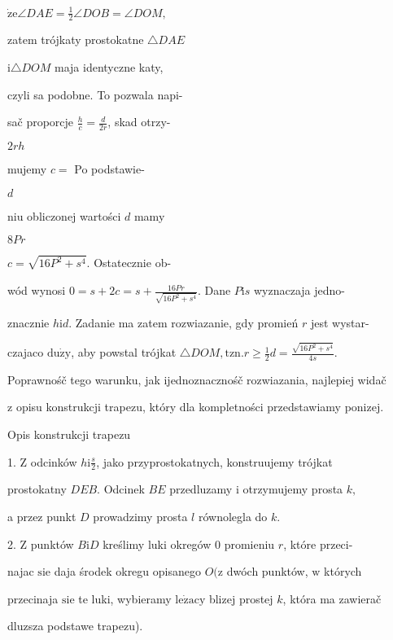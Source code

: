 \documentclass[a4paper,12pt]{article}
\begin{document}
$\dot{\mathrm{z}}\mathrm{e} \angle DAE = \displaystyle \frac{1}{2}\angle DOB = \angle DOM,$

zatem trójkaty prostokatne $\triangle DAE$

$\mathrm{i} \triangle DOM$ maja identyczne katy,

czyli sa podobne. To pozwala napi-

sač proporcje $\displaystyle \frac{h}{c}= \displaystyle \frac{d}{2r}$, skad otrzy-

$2rh$

mujemy $c =$ Po podstawie-

$d$

niu obliczonej wartości $d$ mamy

$8Pr$

$c= \sqrt{16P^{2}+s^{4}}$. Ostatecznie ob-

wód wynosi $0=s+2c=s+\displaystyle \frac{16Pr}{\sqrt{16P^{2}+s^{4}}}$. Dane $P\mathrm{i}s$ wyznaczaja jedno-

znacznie $h\mathrm{i}d$. Zadanie ma zatem rozwiazanie, gdy promień $r$ jest wystar-

czajaco $\mathrm{d}\mathrm{u}\dot{\mathrm{z}}\mathrm{y}$, aby powstal trójkat $\triangle DOM, \mathrm{t}\mathrm{z}\mathrm{n}. r\displaystyle \geq\frac{1}{2}d=\frac{\sqrt{16P^{2}+s^{4}}}{4s}.$

Poprawnośč tego warunku, jak ijednoznacznośč rozwiazania, najlepiej widač

$\mathrm{z}$ opisu konstrukcji trapezu, który dla kompletności przedstawiamy ponizej.

Opis konstrukcji trapezu

1. $\mathrm{Z}$ odcinków $h \mathrm{i} \displaystyle \frac{s}{2}$, jako przyprostokatnych, konstruujemy trójkat

prostokatny $DEB$. Odcinek $BE$ przedluzamy $\mathrm{i}$ otrzymujemy prosta $k,$

a przez punkt $D$ prowadzimy prosta $l$ równolegla do $k.$

2. $\mathrm{Z}$ punktów $B\mathrm{i}D$ kreślimy luki okregów $0$ promieniu $r$, które przeci-

najac $\mathrm{s}\mathrm{i}\mathrm{e}$ daja środek okregu opisanego $O (\mathrm{z}$ dwóch punktów, $\mathrm{w}$ których

przecinaja $\mathrm{s}\mathrm{i}\mathrm{e}$ te luki, wybieramy $\mathrm{l}\mathrm{e}\dot{\mathrm{z}}\mathrm{a}\mathrm{c}\mathrm{y}$ blizej prostej $k$, która ma zawierač

dluzsza podstawe trapezu).
\end{document}
